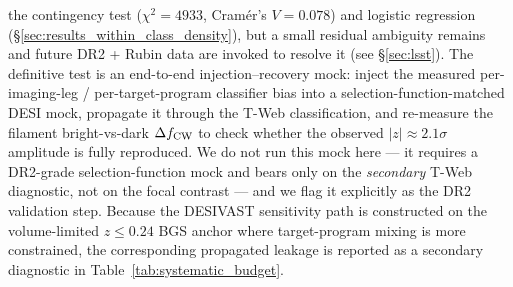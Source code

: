 \documentclass[twocolumn,linenumbers]{aastex702}
\begin{document}
the contingency test ($\chi^2\!=\!4933$, Cram\'{e}r's $V\!=\!0.078$)
and logistic regression (\S\ref{sec:results_within_class_density}),
but a small residual ambiguity remains and future DR2 + Rubin data
are invoked to resolve it (see \S\ref{sec:lsst}). The definitive test
is an end-to-end injection--recovery mock: inject the measured
per-imaging-leg / per-target-program classifier bias into a
selection-function-matched DESI mock, propagate it through the
T-Web classification, and re-measure the filament bright-vs-dark
$\Delta f_{\rm CW}$ to check whether the observed
$|z|\!\approx\!2.1\sigma$ amplitude is fully reproduced. We do not run
this mock here --- it requires a DR2-grade selection-function mock and
bears only on the \emph{secondary} T-Web diagnostic, not on the focal contrast
--- and we flag it explicitly as the DR2 validation step. Because the
DESIVAST sensitivity path is constructed on the volume-limited $z\!\le\!0.24$
BGS anchor where target-program mixing is more constrained, the
corresponding propagated leakage is reported as a secondary diagnostic
in Table~\ref{tab:systematic_budget}.
\end{document}
